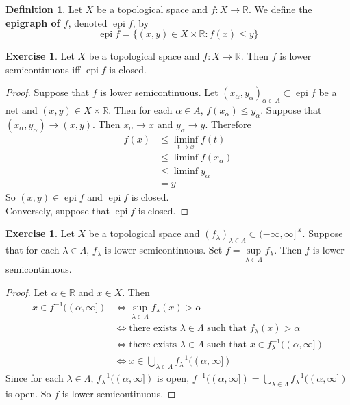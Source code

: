 \documentclass[12pt]{amsart}
\theoremstyle{definition}
\newtheorem{defn}[definition]{Definition}
\newtheorem{ex}[definition]{Exercise}
\newcommand{\al}{\alpha}
\newcommand{\lam}{\lambda}
\newcommand{\Lam}{\Lambda}
\newcommand{\R}{\mathbb{R}}
\newcommand{\tbf}[1]{\textbf{#1}}
\newcommand{\lsc}{lower semicontinuous}
\DeclareMathOperator{\epi}{epi}
\DeclareMathOperator*{\0}{\mbf{0}}
\DeclareMathOperator*{\1}{\mbf{1}}
\begin{document}
	\begin{defn}
		Let $X$ be a topological space and $f: X \rightarrow \R$. We define the \tbf{epigraph of $f$}, denoted $\epi f$, by 
		$$\epi f = \{(x, y) \in X \times \R: f(x) \leq y\}$$
	\end{defn}

	\begin{ex}
		Let $X$ be a topological space and $f: X \rightarrow \R$. Then $f$ is lower semicontinuous iff $\epi f$ is closed.
	\end{ex}

	\begin{proof}
		Suppose that $f$ is lower semicontinuous. Let $(x_{\al}, y_{\al})_{\al \in A} \subset \epi f$ be a net and $(x, y) \in X \times \R$. Then for each $\al \in A$, $f(x_{\al}) \leq y_{\al}$. Suppose that $(x_{\al}, y_{\al}) \rightarrow (x, y)$. Then $x_{\al} \rightarrow x$ and $y_{\al} \rightarrow y$. Therefore 
		\begin{align*}
			f(x) 
			& \leq \liminf_{t \rightarrow x} f(t) \\
			& \leq \liminf f(x_{\al}) \\
			& \leq \liminf y_{\al} \\
			&= y 
		\end{align*}
	So $(x, y) \in \epi f$ and $\epi f$ is closed. \\
	Conversely, suppose that $\epi f$ is closed. 
	\end{proof}

	\begin{ex}
		Let $X$ be a topological space and $ (f_{\lam})_{\lam \in \Lam} \subset (-\infty, \infty]^X$. Suppose that for each $\lam \in \Lam$, $f_\lam$ is \lsc. Set $f = \sup\limits_{\lam \in \Lam} f_{\lam}$. Then $f$ is \lsc.
	\end{ex}

	\begin{proof}
		Let $\al \in \R$ and $x \in X$. Then 
		\begin{align*}
			x \in f^{-1}((\al, \infty])
			& \iff \sup_{\lam \in \Lam} f_{\lam}(x) > \al \\
			& \iff \text{there exists $\lam \in \Lam$ such that } f_{\lam}(x) > \al \\
			& \iff \text{there exists $\lam \in \Lam$ such that } x \in f_{\lam}^{-1}((\al, \infty]) \\
			& \iff x \in \bigcup_{\lam \in \Lam} f_{\lam}^{-1}((\al, \infty])
		\end{align*}
		Since for each $\lam \in \Lam$, $f_{\lam}^{-1}((\al, \infty])$ is open, $f^{-1}((\al, \infty]) = \bigcup\limits_{\lam \in \Lam} f_{\lam}^{-1}((\al, \infty])$ is open. So $f$ is \lsc.
	\end{proof}
\end{document}
